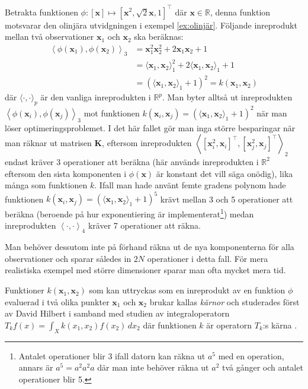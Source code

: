 \documentclass[a4paper, 12pt]{report}
\theoremstyle{definition}
\theoremstyle{remark}
\newcommand{\bfx}{\mathbf{x}}
\newcommand{\llangle}{\left\langle}
\newcommand{\rrangle}{\right\rangle}
\newcommand{\inner}[2]{\llangle #1, #2 \rrangle}
\begin{document}
	Betrakta funktionen $\phi:\left[\bfx\right]\longmapsto \left[\bfx^2,\sqrt{2}\bfx, 1\right]^\intercal$ där $\bfx\in\mathbb{R}$, denna funktion motsvarar den olinjära utvidgningen i exempel \ref{ex:olinjär}. Följande inreprodukt mellan två observationer $\mathbf{x}_1$ och $\mathbf{x}_2$ ska beräknas:
	\begin{align*}
	\left\langle \phi\left(\mathbf{x}_1\right), \phi\left(\mathbf{x}_2\right) \right\rangle_3 &= \bfx_1^2\bfx_2^2 + 2\bfx_1\bfx_2 + 1\\
	&= \langle \bfx_1, \bfx_2 \rangle_1^2 + 2\langle \bfx_1, \bfx_2 \rangle_1 + 1\\
	&= \left(\langle\bfx_1, \bfx_2 \rangle_1 + 1\right)^2 = k\left(\bfx_1, \bfx_2\right)
	\end{align*}
	där $\langle \cdot, \cdot \rangle_p$ är den vanliga inreprodukten i $\mathbb{R}^p$. Man byter alltså ut inreprodukten $\inner{\phi\left(\bfx_i\right)}{\phi\left(\bfx_j\right)}_3$ mot funktionen $k\left(\bfx_i, \bfx_j\right)=\left(\langle\bfx_1, \bfx_2 \rangle_1 + 1\right)^2$ när man löser optimeringsproblemet. I det här fallet gör man inga större besparingar när man räknar ut matrisen $\mathbf{K}$, eftersom inreprodukten $\inner{[\bfx_i^2, \bfx_i]^\intercal}{[\bfx_j^2, \bfx_j]^\intercal}_2$ endast kräver 3 operationer att beräkna (här används inreprodukten i $\mathbb{R}^2$  eftersom den sista komponenten i $\phi(\bfx)$ är konstant det vill säga onödig), lika många som funktionen $k$. Ifall man hade använt femte gradens polynom hade funktionen $k\left(\bfx_i, \bfx_j\right)=\left(\langle\bfx_1, \bfx_2 \rangle_1 + 1\right)^5$ krävt mellan 3 och 5 operationer att beräkna (beroende på hur exponentiering är implementerat\footnote{Antalet operationer blir 3 ifall datorn kan räkna ut $a^5$ med en operation, annars är $a^5=a^2a^2a$ där man inte behöver räkna ut $a^2$ två gånger och antalet operationer blir 5.}) medan inreprodukten $\inner{\cdot}{\cdot}_4$ kräver 7 operationer att räkna.
	
	Man behöver dessutom inte på förhand räkna ut de nya komponenterna för alla observationer och sparar således in $2N$ operationer i detta fall. För mera realistiska exempel med större dimensioner sparar man ofta mycket mera tid.

Funktioner $k\left(\bfx_1, \bfx_2\right)$ som kan uttryckas som en inreprodukt av en funktion $\phi$ evaluerad i två olika punkter $\bfx_1$ och $\bfx_2$ brukar kallas \emph{kärnor} och studerades först av David Hilbert \cite{Hilbert} i samband med studien av integraloperatorn $T_k f\left(x\right)=\int_{X}k\left(x_1, x_2\right)f\left(x_2\right)\,dx_2$ där funktionen $k$ är operatorn $T_k$:s kärna \cite{LearningKernels}.
\end{document}
